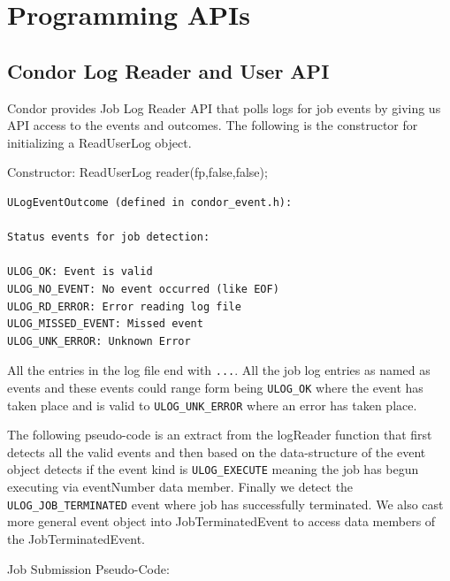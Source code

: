 \documentclass[ms,electronic,double]{nuthesis}
\begin{document}
\section{Programming APIs}
\subsection{Condor Log Reader and User API}

Condor provides Job Log Reader API\cite{manual56} that polls logs for job events by giving us 
API access to the events and outcomes. The following is the constructor for 
initializing a ReadUserLog object.

Constructor:
ReadUserLog reader(fp,false,false);
\begin{verbatim}
ULogEventOutcome (defined in condor_event.h):

Status events for job detection:

ULOG_OK: Event is valid
ULOG_NO_EVENT: No event occurred (like EOF)
ULOG_RD_ERROR: Error reading log file
ULOG_MISSED_EVENT: Missed event
ULOG_UNK_ERROR: Unknown Error
\end{verbatim}

All the entries in the log file end with \texttt{...}. All the job 
log entries as named as events and these events could range form being  \texttt{ULOG\_OK} where 
the event has taken place and is valid to \texttt{ULOG\_UNK\_ERROR} where an error has 
taken place.

The following pseudo-code is an extract from the logReader function that first 
detects all the valid events and then based on the data-structure of the event 
object detects if the event kind is \texttt{ULOG\_EXECUTE} meaning the job has begun 
executing via eventNumber data member. Finally we detect the \texttt{ULOG\_JOB\_TERMINATED} 
event where job has successfully terminated. We also cast more general event 
object into JobTerminatedEvent to access data members of the JobTerminatedEvent.


Job Submission Pseudo-Code:
\end{document}
